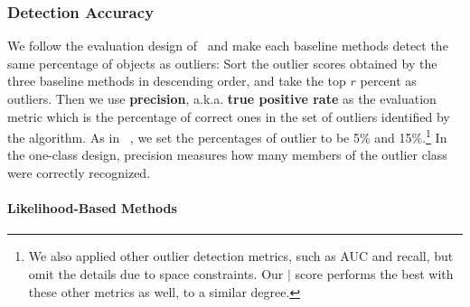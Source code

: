 \documentclass[conference]{IEEEtran}
\begin{document}
						\subsubsection{Detection Accuracy} We follow the evaluation design of~\cite{Gao2010} and 
	make each baseline methods detect the same percentage of  objects as outliers:
					Sort the outlier scores obtained by the three baseline methods in descending order, and take the top $r$ percent as outliers. Then we use \textbf{precision}, a.k.a. \textbf{true positive rate} as the evaluation metric which is the percentage of correct ones in the set of outliers identified by the algorithm. As in ~\cite{Gao2010}, we set the percentages of outlier to be 5\% and 15\%.\footnote{We also applied other outlier detection metrics, such as AUC and recall, but omit the details due to space constraints. Our $\mid$ score performs the best with these other metrics as well, to a similar degree.} In the one-class design, precision measures how many members of the outlier class were correctly recognized.

						
						\paragraph{Likelihood-Based Methods} 
						
\end{document}
